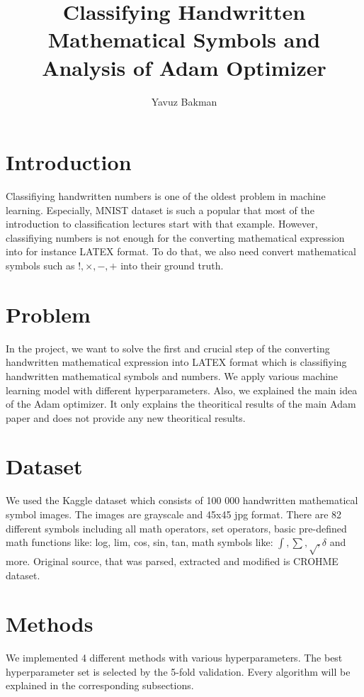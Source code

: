 \documentclass[10pt]{article}
\title{Classifying Handwritten Mathematical Symbols and Analysis of Adam Optimizer}
\author{Yavuz Bakman}
\begin{document}
\maketitle
\section{Introduction}
\hspace{10mm}
Classifiying handwritten numbers is one of the oldest problem in machine learning. Especially, MNIST dataset is such a popular that most of the introduction to classification lectures start with that example. However, classifiying numbers is not enough for the converting mathematical expression into  for instance LATEX format. To do that, we also need convert mathematical symbols such as $ !, \times , - ,+ $ into their ground truth.

\section{Problem}
\hspace{10mm}
In the project, we want to solve the first and crucial step of the converting handwritten mathematical expression into LATEX format which is classifiying handwritten mathematical symbols and numbers. We apply various machine learning model with different  hyperparameters. Also, we explained the main idea of the Adam optimizer. It only explains the theoritical results of the main Adam paper and does not provide any new theoritical results.

\section{Dataset}
\hspace{10mm}
We used the Kaggle dataset \cite{dataset} which consists of 100 000 handwritten mathematical symbol images. The images are grayscale and 45x45 jpg format. There are 82 different symbols including all math operators, set operators, basic pre-defined math functions like: log, lim, cos, sin, tan, math symbols like: $\int, \sum, \sqrt,  \delta$ and more. Original source, that was parsed, extracted and modified is CROHME     \cite{dataset2} dataset.

\section{Methods}
We implemented 4 different methods with various hyperparameters. The best hyperparameter set is selected by the 5-fold validation. Every algorithm will be explained in the corresponding subsections.
\end{document}
